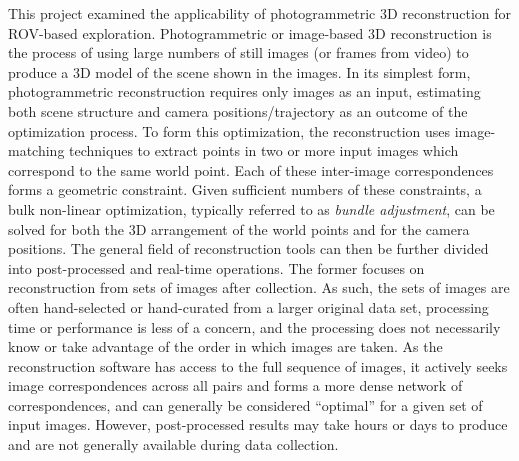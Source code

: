 \documentclass[letterpaper,12pt]{article}
\begin{document}
This project examined the applicability of photogrammetric 3D reconstruction for ROV-based exploration.   Photogrammetric or image-based 3D reconstruction is the process of using large numbers of still images (or frames from video) to produce a 3D model of the scene shown in the images.   In its simplest form, photogrammetric reconstruction requires only images as an input, estimating both scene structure and camera positions/trajectory as an outcome of the optimization process.   To form this optimization, the reconstruction uses image-matching techniques to extract points in two or more input images which correspond to the same world point.   Each of these inter-image correspondences forms a geometric constraint.   Given sufficient numbers of these constraints, a bulk non-linear optimization, typically referred to as \textit{bundle adjustment}, can be solved for both the 3D arrangement of the world points and for the camera positions.   The general field of reconstruction tools can then be further divided into post-processed and real-time operations.   The former focuses on reconstruction from sets of images after collection.  As such, the sets of images are often hand-selected or hand-curated from a larger original data set, processing time or performance is less of a concern, and the processing does  not necessarily know or take advantage of the order in which images are taken.   As the reconstruction software has access to the full sequence of images, it actively seeks image correspondences across all pairs and forms a more dense network of correspondences, and can generally be considered ``optimal'' for a given set of input images.   However, post-processed results may take hours or days to produce and are not generally available during data collection.
\end{document}
